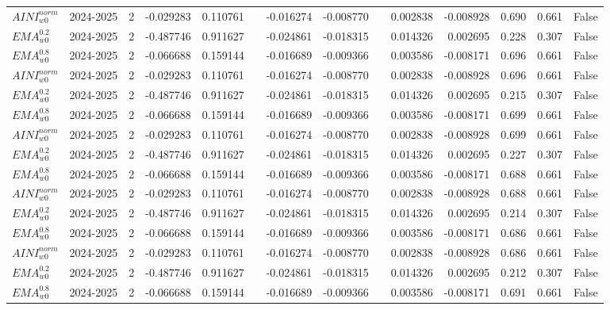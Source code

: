 \begin{tabular}{@{}llrrrrrrrrrlll@{}}
$AINI^{norm}_{w0}$ & 2024-2025 & 2 & -0.029283 & 0.110761 &  & -0.016274 & -0.008770 &  & 0.002838 & -0.008928 & 0.690 & 0.661 & False \\
$EMA^{0.2}_{w0}$ & 2024-2025 & 2 & -0.487746 & 0.911627 &  & -0.024861 & -0.018315 &  & 0.014326 & 0.002695 & 0.228 & 0.307 & False \\
$EMA^{0.8}_{w0}$ & 2024-2025 & 2 & -0.066688 & 0.159144 &  & -0.016689 & -0.009366 &  & 0.003586 & -0.008171 & 0.696 & 0.661 & False \\
$AINI^{norm}_{w0}$ & 2024-2025 & 2 & -0.029283 & 0.110761 &  & -0.016274 & -0.008770 &  & 0.002838 & -0.008928 & 0.696 & 0.661 & False \\
$EMA^{0.2}_{w0}$ & 2024-2025 & 2 & -0.487746 & 0.911627 &  & -0.024861 & -0.018315 &  & 0.014326 & 0.002695 & 0.215 & 0.307 & False \\
$EMA^{0.8}_{w0}$ & 2024-2025 & 2 & -0.066688 & 0.159144 &  & -0.016689 & -0.009366 &  & 0.003586 & -0.008171 & 0.699 & 0.661 & False \\
$AINI^{norm}_{w0}$ & 2024-2025 & 2 & -0.029283 & 0.110761 &  & -0.016274 & -0.008770 &  & 0.002838 & -0.008928 & 0.699 & 0.661 & False \\
$EMA^{0.2}_{w0}$ & 2024-2025 & 2 & -0.487746 & 0.911627 &  & -0.024861 & -0.018315 &  & 0.014326 & 0.002695 & 0.227 & 0.307 & False \\
$EMA^{0.8}_{w0}$ & 2024-2025 & 2 & -0.066688 & 0.159144 &  & -0.016689 & -0.009366 &  & 0.003586 & -0.008171 & 0.688 & 0.661 & False \\
$AINI^{norm}_{w0}$ & 2024-2025 & 2 & -0.029283 & 0.110761 &  & -0.016274 & -0.008770 &  & 0.002838 & -0.008928 & 0.688 & 0.661 & False \\
$EMA^{0.2}_{w0}$ & 2024-2025 & 2 & -0.487746 & 0.911627 &  & -0.024861 & -0.018315 &  & 0.014326 & 0.002695 & 0.214 & 0.307 & False \\
$EMA^{0.8}_{w0}$ & 2024-2025 & 2 & -0.066688 & 0.159144 &  & -0.016689 & -0.009366 &  & 0.003586 & -0.008171 & 0.686 & 0.661 & False \\
$AINI^{norm}_{w0}$ & 2024-2025 & 2 & -0.029283 & 0.110761 &  & -0.016274 & -0.008770 &  & 0.002838 & -0.008928 & 0.686 & 0.661 & False \\
$EMA^{0.2}_{w0}$ & 2024-2025 & 2 & -0.487746 & 0.911627 &  & -0.024861 & -0.018315 &  & 0.014326 & 0.002695 & 0.212 & 0.307 & False \\
$EMA^{0.8}_{w0}$ & 2024-2025 & 2 & -0.066688 & 0.159144 &  & -0.016689 & -0.009366 &  & 0.003586 & -0.008171 & 0.691 & 0.661 & False \\

\end{tabular}
